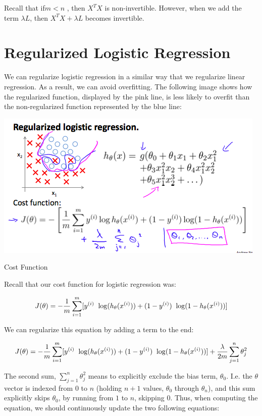 \documentclass[10pt,a4paper,UTF8]{article}
\begin{document}
Recall that if\(m < n\) , then  \(X^{T}X\)  is non-invertible. However, when we add the term \(\lambda L\), then \(X^{T}X + \lambda L\) becomes invertible.
\section{Regularized Logistic Regression}
\label{sec:org1f49873}


We can regularize logistic regression in a similar way that we regularize linear regression. As a result, we can avoid overfitting. The following image shows how the regularized function, displayed by the pink line, is less likely to overfit than the non-regularized function represented by the blue line:


\begin{center}
\includegraphics[width=.9\linewidth]{../../img/computer_ng/20171009LRregularized.png}
\end{center}

Cost Function

Recall that our cost function for logistic regression was:

\begin{equation}
\label{eq:8}
J(\theta) = - \frac{1}{m} \sum_{i=1}^m \large[ y^{(i)}\ \log (h_\theta (x^{(i)})) + (1 - y^{(i)})\ \log (1 - h_\theta(x^{(i)})) \large]
\end{equation}

We can regularize this equation by adding a term to the end:

\begin{equation}
\label{eq:9}
J(\theta) = - \frac{1}{m} \sum_{i=1}^m \large[ y^{(i)}\ \log (h_\theta (x^{(i)})) + (1 - y^{(i)})\ \log (1 - h_\theta(x^{(i)}))\large] + \frac{\lambda}{2m}\sum_{j=1}^n \theta_j^2
\end{equation}

The second sum, \(\sum_{j=1}^{n}\theta_{j}^{2}\) means to explicitly exclude the bias term, \(\theta_{0}\). I.e. the \(\theta\) vector is indexed from \(0\) to \(n\) (holding \(n+1\) values, \(\theta_{0}\) through \(\theta_{n}\)), and this sum explicitly skips \(\theta_{0}\), by running from \(1\) to \(n\), skipping \(0\). Thus, when computing the equation, we should continuously update the two following equations:
\end{document}
